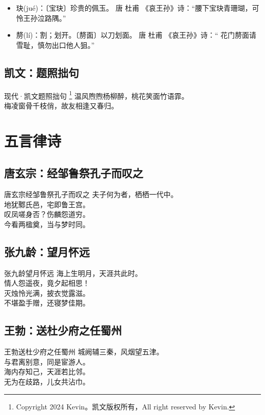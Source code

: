\documentclass[12pt,oneside,a5paper]{book}
\begin{document}
\begin{itemize}
\item 玦(jué)：〔宝玦〕珍贵的佩玉。  唐 杜甫 《哀王孙》诗：“腰下宝玦青珊瑚，可怜王孙泣路隅。” 
\item 剺(lí)：割；划开。〔剺面〕以刀划面。 唐 杜甫 《哀王孙》诗：“ 花门剺面请雪耻，慎勿出口他人狙。”  
\end{itemize}

\chapter*{凯文：题照拙句}
\begin{poemzh}{现代·凯文}{题照拙句}
\footnote[0]{Copyright 2024 Kevin。凯文版权所有，All right reserved by Kevin.}
温风煦煦杨柳醉，桃花笑面竹语霏。\\
梅凌窗骨千枝俏，故友相逢又春归。\\
\end{poemzh}

\part{五言律诗}
\chapter{唐玄宗：经邹鲁祭孔子而叹之}
\begin{poemzh}{唐玄宗}{经邹鲁祭孔子而叹之}
夫子何为者，栖栖一代中。\\
地犹鄹氏邑，宅即鲁王宫。\\
叹凤嗟身否？伤麟怨道穷。\\
今看两楹奠，当与梦时同。\\ 
\end{poemzh}

\chapter{张九龄：望月怀远}
\begin{poemzh}{张九龄}{望月怀远}
海上生明月，天涯共此时。\\
情人怨遥夜，竟夕起相思！\\
灭烛怜光满，披衣觉露滋。\\
不堪盈手赠，还寝梦佳期。\\ 
\end{poemzh}

\chapter{王勃：送杜少府之任蜀州}
\begin{poemzh}{王勃}{送杜少府之任蜀州}
城阙辅三秦，风烟望五津。\\
与君离别意，同是宦游人。\\
海内存知己，天涯若比邻。\\
无为在歧路，儿女共沾巾。\\ 
\end{poemzh}
\end{document}
